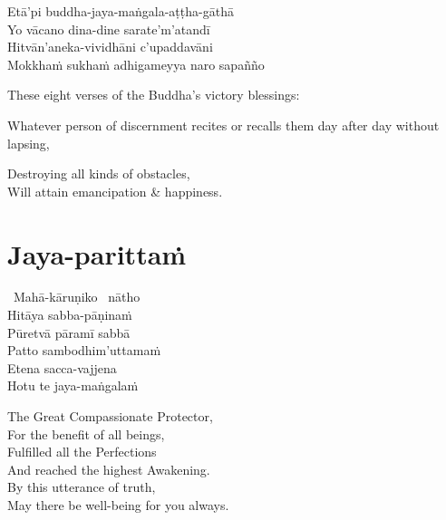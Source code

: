 \begin{pali-hang-continued}
  Etā'pi buddha-jaya-maṅgala-aṭṭha-gāthā\\
  Yo vācano dina-dine sarate'm'atandī\\
  Hitvān'aneka-vividhāni c'upaddavāni\\
  Mokkhaṁ sukhaṁ adhigameyya naro sapañño
\end{pali-hang-continued}

\begin{english-verses}
  These eight verses of the Buddha's victory blessings:
  \begin{english-hangtogether-verses}
    Whatever person of discernment recites or recalls them day after day without lapsing,
  \end{english-hangtogether-verses}
  Destroying all kinds of obstacles,\\
  Will attain emancipation \& happiness.
\end{english-verses}

\suttaRef{[Trad]}

\section{Jaya-parittaṁ}
\label{jaya-parittam}

\begin{pali-hangtogether}
  \anglebracketleft\ \hspace{-0.5mm}Mahā-kāruṇiko \hspace{-0.5mm}\anglebracketright\ nātho\\
  Hitāya sabba-pāṇinaṁ\\
  Pūretvā pāramī sabbā\\
  Patto sambodhim'uttamaṁ\\
  Etena sacca-vajjena\\
  Hotu te jaya-maṅgalaṁ
\end{pali-hangtogether}

\begin{english-verses}
  The Great Compassionate Protector,\\
  For the benefit of all beings,\\
  Fulfilled all the Perfections\\
  And reached the highest Awakening.\\
  By this utterance of truth,\\
  May there be well-being for you always.
\end{english-verses}

